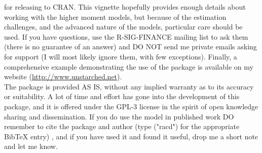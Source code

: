 for releasing to CRAN. This vignette hopefully provides enough details about working with the higher moment models, but because of the estimation challenges,
and the advanced nature of the models, particular care should be used. If you have questions, use the R-SIG-FINANCE mailing list to ask them (there is no guarantee
of an answer) and DO NOT send me private emails asking for support (I will most likely ignore them, with few exceptions). Finally, a comprehensive example
demonstrating the use of the package is available on my website (\url{http://www.unstarched.net}).\\
The package is provided AS IS, without any implied warranty as to its accuracy or suitability. A lot of time and effort has gone into the development of this
package, and it is offered under the GPL-3 license in the spirit of open knowledge sharing and dissemination. If you do use the model in published work
DO remember to cite the package and author (type \verb@citation@("racd") for the appropriate BibTeX entry) , and if you have used it and found it
useful, drop me a short note and let me know.
